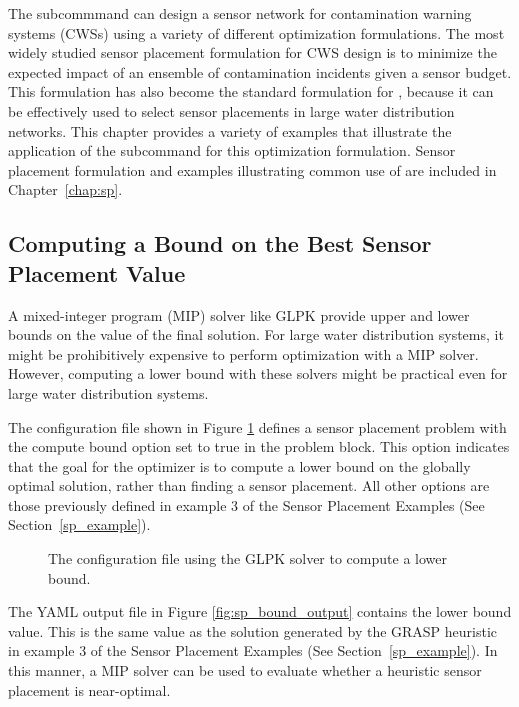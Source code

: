 
The  subcommmand can design a sensor network for contamination
warning systems (CWSs) using a variety of different optimization
formulations. The most widely studied sensor placement formulation
for CWS design is to minimize the expected impact of an ensemble
of contamination incidents given a sensor budget. This formulation
has also become the standard formulation for , because it
can be effectively used to select sensor placements in large water
distribution networks. This chapter provides a variety of examples
that illustrate the application of the  subcommand for this optimization formulation.
Sensor placement formulation and examples illustrating common use of  are included in Chapter~\ref{chap:sp}.

\subsection{Computing a Bound on the Best Sensor Placement Value}\label{solvers_solvers2a}

A mixed-integer program (MIP) solver like GLPK provide upper and lower bounds on the value
of the final solution. For large water distribution systems, it
might be prohibitively expensive to perform optimization with a MIP
solver. However, computing a lower bound with these solvers might
be practical even for large water distribution systems.

The configuration file shown in Figure \ref{fig:sp_bound}
defines a sensor placement problem with the compute bound option set to true in the 
problem block. This option indicates that the goal for the optimizer is to compute a lower bound 
on the globally optimal solution, rather than finding a sensor placement. 
All other options are those previously defined in example 3 of the Sensor 
Placement Examples (See Section~\ref{sp_example}).

\begin{figure}[h]
  \caption{The  configuration file using the GLPK solver to compute a lower bound.}
  \label{fig:sp_bound}
\end{figure}

The YAML output file in Figure \ref{fig:sp_bound_output} contains the lower bound value. 
This is the same value as the solution generated by the GRASP heuristic in 
example 3 of the Sensor Placement Examples (See Section~\ref{sp_example}). 
In this manner, a MIP solver can be used to evaluate whether a heuristic 
sensor placement is near-optimal.

